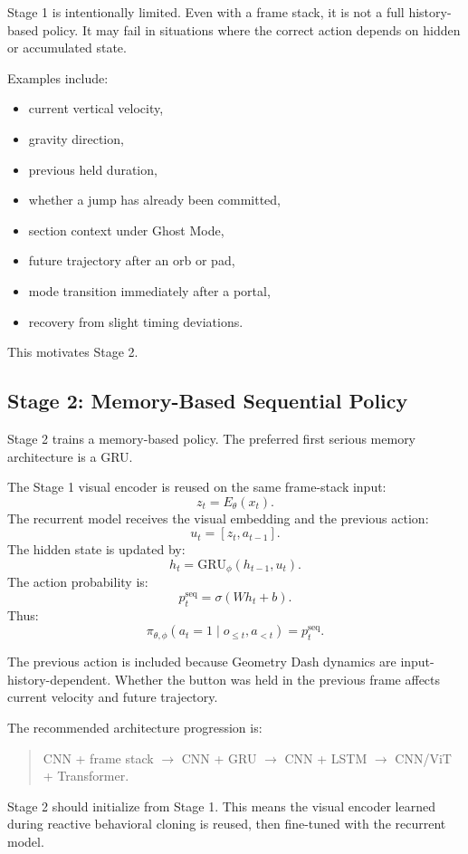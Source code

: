\documentclass[11pt]{article}
\begin{document}
Stage 1 is intentionally limited. Even with a frame stack, it is not a full history-based policy. It may fail in situations where the correct action depends on hidden or accumulated state.

Examples include:
\begin{itemize}
  \item current vertical velocity,
  \item gravity direction,
  \item previous held duration,
  \item whether a jump has already been committed,
  \item section context under Ghost Mode,
  \item future trajectory after an orb or pad,
  \item mode transition immediately after a portal,
  \item recovery from slight timing deviations.
\end{itemize}

This motivates Stage 2.

\subsection{Stage 2: Memory-Based Sequential Policy}

Stage 2 trains a memory-based policy. The preferred first serious memory architecture is a GRU\@.

The Stage 1 visual encoder is reused on the same frame-stack input:
\[
  z_t = E_\theta(x_t).
\]
The recurrent model receives the visual embedding and the previous action:
\[
  u_t = [z_t,a_{t-1}].
\]
The hidden state is updated by:
\[
  h_t = \mathrm{GRU}_\phi(h_{t-1},u_t).
\]
The action probability is:
\[
  p_t^{\mathrm{seq}} = \sigma(Wh_t+b).
\]
Thus:
\[
  \pi_{\theta,\phi}(a_t=1 \mid o_{\le t},a_{<t}) = p_t^{\mathrm{seq}}.
\]

The previous action is included because Geometry Dash dynamics are input-history-dependent. Whether the button was held in the previous frame affects current velocity and future trajectory.

The recommended architecture progression is:
\begin{quote}
CNN + frame stack \(\rightarrow\) CNN + GRU \(\rightarrow\) CNN + LSTM \(\rightarrow\) CNN/ViT + Transformer.
\end{quote}

Stage 2 should initialize from Stage 1. This means the visual encoder learned during reactive behavioral cloning is reused, then fine-tuned with the recurrent model.
\end{document}
